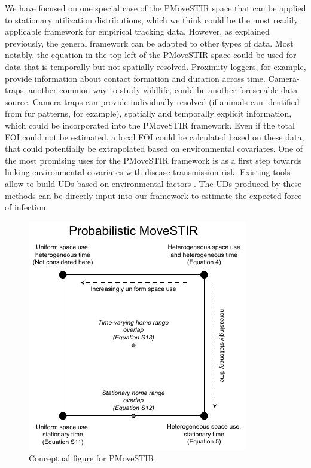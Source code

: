 \documentclass[letterpaper]{article}
\begin{document}
We have focused on one special case of the PMoveSTIR space that can be applied to stationary utilization distributions, which we think could be the most readily applicable framework for empirical tracking data. 
However, as explained previously, the general framework can be adapted to other types of data. Most notably, the equation in the top left of the PMoveSTIR space could be used for data that is temporally but not spatially resolved. Proximity loggers, for example, provide information about contact formation and duration across time. 
Camera-traps, another common way to study wildlife, could be another foreseeable data source. Camera-traps can provide individually resolved (if animals can identified from fur patterns, for example), spatially and temporally explicit information, which could be incorporated into the PMoveSTIR framework. Even if the total FOI could not be estimated, a local FOI could be calculated based on these data, that could potentially be extrapolated based on environmental covariates. 
One of the most promising uses for the PMoveSTIR framework is as a first step towards linking environmental covariates with disease transmission risk. 
Existing tools allow to build UDs based on environmental factors \citep{Signer2017,Michelot2020}. The UDs produced by these methods can be directly input into our framework to estimate the expected force of infection.





\begin{figure}
    \includegraphics[width=\textwidth]{figures/conceptual_figure_pmovestir.pdf}
    \caption{Conceptual figure for PMoveSTIR}
	\label{fig:square}
\end{figure}
\end{document}
